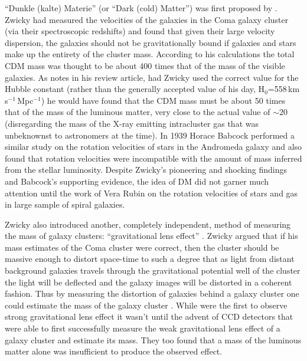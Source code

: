 ``Dunkle (kalte) Materie'' (or ``Dark (cold) Matter'') was first proposed by \citet{Zwicky:1933ub}.
Zwicky had measured the velocities of the galaxies in the Coma galaxy cluster (via their spectroscopic redshifts) and found that given their large velocity dispersion, the galaxies should not be gravitationally bound if galaxies and stars make up the entirety of the cluster mass.
According to his calculations the total CDM mass was thought to be about 400 times that of the mass of the visible galaxies. 
As \citet{vandenBergh:1999jf} notes in his review article, had Zwicky used the correct value for the Hubble constant (rather than the generally accepted value of his day, H$_0$=558\,km\,s$^{-1}$\,Mpc$^{-1}$) he would have found that the CDM mass must be about 50 times that of the mass of the luminous matter, very close to the actual value of $\sim20$ (disregarding the mass of the X-ray emitting intracluster gas that was unbeknownst to astronomers at the time).
In 1939 Horace Babcock performed a similar study on the rotation velocities of stars in the Andromeda galaxy and also found that rotation velocities were incompatible with the amount of mass inferred from the stellar luminosity.
Despite Zwicky's pioneering and shocking findings and Babcock's supporting evidence, the idea of DM did not garner much attention until the work of Vera Rubin \citep[e.g.,][]{Rubin:1970gu} on the rotation velocities of stars and gas in large sample of spiral galaxies.

Zwicky also introduced another, completely independent, method of measuring the mass of galaxy clusters: ``gravitational lens effect'' \citep{Zwicky:1937ec}.
Zwicky argued that if his mass estimates of the Coma cluster were correct, then the cluster should be massive enough to distort space-time to such a degree that as light from distant background galaxies travels through the gravitational potential well of the cluster the light will be deflected and the galaxy images will be distorted in a coherent fashion.
Thus by measuring the distortion of galaxies behind a galaxy cluster one could estimate the mass of the galaxy cluster \citep[see Chapter 2 of][for an introduction to weak gravitational lensing]{Courbin:2002wh}.
While \citet{Lynds:1989bc} were the first to observe strong gravitational lens effect it wasn't until the advent of CCD detectors \citep[e.g.,][]{Gavazzi:1990uy} that\citet{Tyson:1990bc} were able to first successfully measure the weak gravitational lens effect of a galaxy cluster and estimate its mass.
They too found that a mass of the luminous matter alone was insufficient to produce the observed effect.

